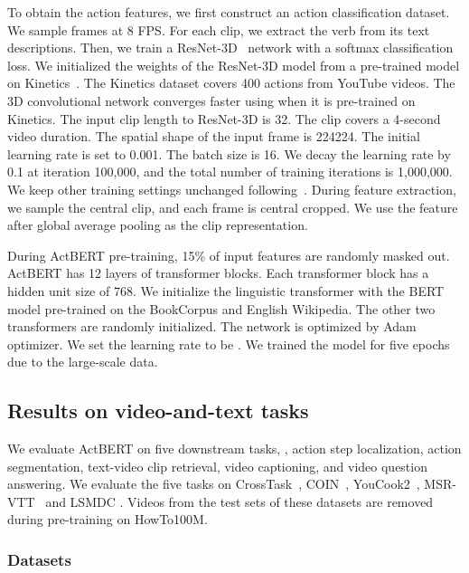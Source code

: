 \documentclass[10pt,twocolumn,letterpaper]{article}
\newcommand{\ours}{ActBERT\xspace}
\begin{document}
To obtain the action features, we first construct an action classification dataset. We sample frames at 8 FPS. For each clip, we extract the verb from its text descriptions. Then, we train a ResNet-3D~\cite{tran2018closer} network with a softmax classification loss.
We initialized the weights of the ResNet-3D model from a pre-trained model on Kinetics~\cite{kay2017kinetics}.
The Kinetics dataset covers 400 actions
from YouTube videos. The 3D convolutional network converges faster using when it is pre-trained on Kinetics.
The input clip length to ResNet-3D is 32. The clip covers a 4-second video duration. The spatial shape of the input frame is 224224.
The initial learning rate is set to 0.001. The batch size is 16. We decay the learning rate by 0.1 at iteration 100,000, and the total number of training iterations is 1,000,000. We keep other training settings unchanged following~\cite{tran2018closer}. During feature extraction, we sample the central clip, and each frame is central cropped. We use the feature after global average pooling as the clip representation.

During \ours pre-training, 15\% of input features are randomly masked out. \ours has 12 layers of transformer blocks. Each transformer block has a hidden unit size of 768.
We initialize the linguistic transformer with the BERT model pre-trained on the BookCorpus \cite{zhu2015aligning} and English Wikipedia.
The other two transformers are randomly initialized.
The network is optimized by Adam optimizer. We set the learning rate to be .
We trained the model for five epochs due to the large-scale data. 

\subsection{Results on video-and-text tasks}
We evaluate \ours on five downstream tasks, \ie, action step localization, action segmentation, text-video clip retrieval, video captioning, and video question answering.
We evaluate the five tasks on  CrossTask~\cite{zhukov2019cross}, COIN~\cite{tang2019coin},
YouCook2~\cite{zhou2018towards}, MSR-VTT~\cite{xu2016msr} and LSMDC \cite{lsmdc}.
Videos from the test sets of these datasets are removed during pre-training on HowTo100M.

\subsubsection{Datasets}
\end{document}
